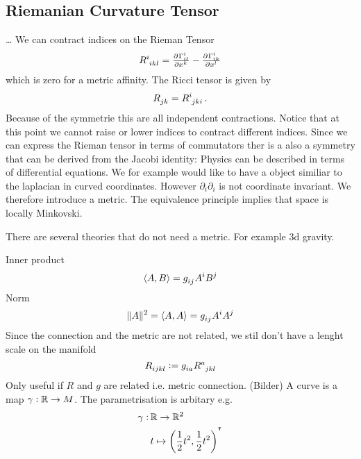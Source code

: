 \subsection{Riemanian Curvature Tensor}
\ldots
We can contract indices on the Rieman Tensor
\begin{equation}
\tensor{R}{^i_i_k_l}=\pd{{\Gamma^i_{il}}}{{x^k}}-\pd{{\Gamma^i_{ik}}}{{x^l}}
\end{equation}
which is zero for a metric affinity. The Ricci tensor is given by
\begin{equation}
\tensor{R}{_j_k}=\tensor{R}{^i_j_k_i}\, .
\end{equation}
Because of the symmetrie this are all independent contractions. Notice that at
this point we cannot raise or lower indices to contract different indices.
Since we can express the Rieman tensor in terms of commutators ther is a also a
symmetry that can be derived from the Jacobi identity:
Physics can be described in terms of differential equations. We for example
would like to have a object similiar to the laplacian in curved coordinates.
However $\partial_i\partial_i$ is not coordinate invariant. We therefore
introduce a metric. The equivalence principle implies that space is locally
Minkovski.
\begin{sidenote}
There are several theories that do not need a metric. For example 3d gravity.
\end{sidenote}
Inner product 
\begin{equation}
\langle A,B\rangle=\tensor{g}{_i_j}\tensor{A}{^i}\tensor{B}{^j}
\end{equation}
Norm
\begin{equation}
\|A\|^2=\langle A,A\rangle=\tensor{g}{_i_j}\tensor{A}{^i}\tensor{A}{^j}
\end{equation}
Since the connection and the metric are not related, we stil don't have a lenght
scale on the manifold
\begin{equation}
\tensor{R}{_i_j_k_l}:=\tensor{g}{_i_a}\tensor{R}{^a_j_k_l}
\end{equation}
Only useful if $R$ and $g$ are related i.e. metric connection.
(Bilder)
A curve is a map $\gamma:\mathbb{R}\to M$. The parametrisation is arbitary e.g.
\begin{equation}
\begin{split}
\gamma:\, &\Reals\to \Reals^2\\
& t\mapsto \left(\frac{1}{2}t^2,\frac{1}{2}t^2\right)^{\transpose}
\end{split}
\end{equation} 